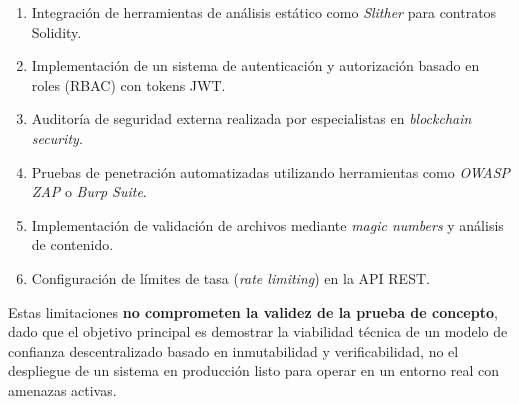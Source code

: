 \begin{enumerate}
\begin{itemize}
        \begin{enumerate}
            \item Integración de herramientas de análisis estático como \textit{Slither} para contratos Solidity.
            \item Implementación de un sistema de autenticación y autorización basado en roles (RBAC) con tokens JWT.
            \item Auditoría de seguridad externa realizada por especialistas en \textit{blockchain security}.
            \item Pruebas de penetración automatizadas utilizando herramientas como \textit{OWASP ZAP} o \textit{Burp Suite}.
            \item Implementación de validación de archivos mediante \textit{magic numbers} y análisis de contenido.
            \item Configuración de límites de tasa (\textit{rate limiting}) en la API REST.
        \end{enumerate}

        Estas limitaciones \textbf{no comprometen la validez de la prueba de concepto}, dado que el objetivo principal es demostrar la viabilidad técnica de un modelo de confianza descentralizado basado en inmutabilidad y verificabilidad, no el despliegue de un sistema en producción listo para operar en un entorno real con amenazas activas.
    \end{itemize}
\end{enumerate}